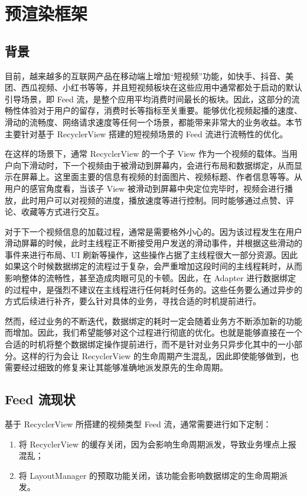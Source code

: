 \chapter{预渲染框架}

\section{背景}

目前，越来越多的互联网产品在移动端上增加“短视频”功能，如快手、抖音、美团、西瓜视频、小红书等等，并且短视频板块在这些应用中通常都处于启动的默认引导场景，即 Feed 流，是整个应用平均消费时间最长的板块。因此，这部分的流畅性体验对于用户的留存，消费时长等指标至关重要。能够优化视频起播的速度、滑动的流畅度、网络请求速度等任何一个场景，都能带来非常大的业务收益。本节主要针对基于 RecyclerView 搭建的短视频场景的 Feed 流进行流畅性的优化。

在这样的场景下，通常 RecyclerView 的一个子 View 作为一个视频的载体。当用户向下滑动时，下一个视频由于被滑动到屏幕内，会进行布局和数据绑定，从而显示在屏幕上。这里面主要的信息有视频的封面图片、视频标题、作者信息等等。从用户的感官角度看，当该子 View 被滑动到屏幕中央定位完毕时，视频会进行播放，此时用户可以对视频的进度，播放速度等进行控制。同时能够通过点赞、评论、收藏等方式进行交互。

对于下一个视频信息的加载过程，通常是需要格外小心的。因为该过程发生在用户滑动屏幕的时候，此时主线程正不断接受用户发送的滑动事件，并根据这些滑动的事件来进行布局、UI 刷新等操作，这些操作占据了主线程很大一部分资源。因此如果这个时候数据绑定的流程过于复杂，会严重增加这段时间的主线程耗时，从而影响整体的流畅性，甚至造成肉眼可见的卡顿。因此，在 Adapter 进行数据绑定的过程中，是强烈不建议在主线程进行任何耗时任务的。这些任务要么通过异步的方式后续进行补齐，要么针对具体的业务，寻找合适的时机提前进行。

然而，经过业务的不断迭代，数据绑定的耗时一定会随着业务方不断添加新的功能而增加。因此，我们希望能够对这个过程进行彻底的优化。也就是能够直接在一个合适的时机将整个数据绑定操作提前进行，而不是针对业务只异步化其中的一小部分。这样的行为会让 RecyclerView 的生命周期产生混乱，因此即使能够做到，也需要经过细致的修复来让其能够准确地派发原先的生命周期。

\section{Feed 流现状}

基于 RecyclerView 所搭建的视频类型 Feed 流，通常需要进行如下定制：

\begin{enumerate}
    \item 将 RecyclerView 的缓存关闭，因为会影响生命周期派发，导致业务埋点上报混乱；
    \item 将 LayoutManager 的预取功能关闭，该功能会影响数据绑定的生命周期派发。
\end{enumerate}

